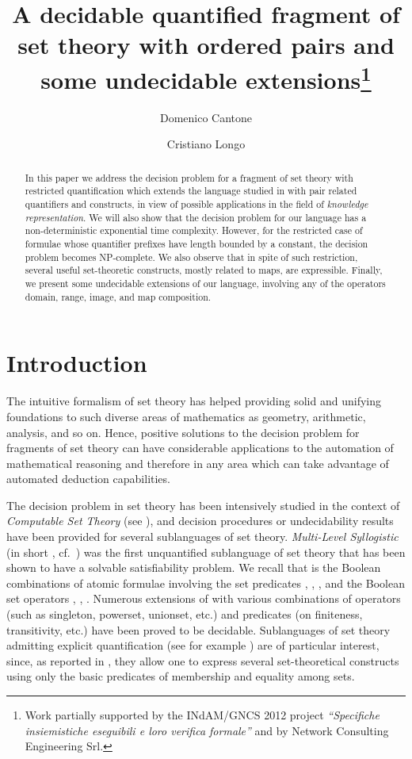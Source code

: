 \documentclass[submission,copyright,creativecommons]{eptcs}
\title{A decidable quantified fragment of set theory with ordered
pairs and some undecidable extensions\thanks{Work partially supported
by the INdAM/GNCS 2012 project
\emph{``Specifiche insiemistiche ese\-guibili e loro verifica 
formale''} and by Network Consulting Engineering Srl.}}
\author{Domenico Cantone
\institute{Department of Mathematics and Computer Science\\
University of Catania, Italy}
\email{cantone@dmi.unict.it}
\and
Cristiano Longo
\institute{Network Consulting Engineering\\
Valverde, Catania, Italy} \email{cristiano.longo@nce.eu} }
\begin{document}
\maketitle

\begin{abstract}
In this paper we address the decision problem for a fragment of set
theory with restricted quantification which extends the language
studied in \cite{BreFerOmoSch1981} with pair related quantifiers and
constructs, in view of possible applications in the field of
\emph{knowledge representation}.
We will also show that the decision problem for our language has a
non-deterministic exponential time complexity.  However, for the
restricted case of formulae whose quantifier prefixes have length
bounded by a constant, the decision problem becomes
\textsc{NP}-complete.  We also observe that in spite of such
restriction, several useful set-theoretic constructs, mostly related
to maps, are expressible.  Finally, we present some undecidable
extensions of our language, involving any of the operators domain,
range, image, and map composition.
\end{abstract}



\section{Introduction}\label{INTRO}

The intuitive formalism of set theory has helped providing solid and
unifying foundations to such diverse areas of mathematics as geometry,
arithmetic, analysis, and so on.
Hence, positive solutions to the decision problem for fragments of
set theory can have considerable applications to the automation of
mathematical reasoning and therefore in any area which can take
advantage of automated deduction capabilities.

The decision problem in set theory has been intensively studied
in the context of \emph{Computable Set Theory} (see
\cite{CanFerOmo89a,CanOmoPol01,SchCanOmo11}), and decision
procedures or undecidability results have been provided for several
sublanguages of set theory.
\emph{Multi-Level Syllogistic} (in short \mls, cf.\
\cite{FerOmoSch1980}) was the first unquantified sublanguage of set
theory that has been shown to have a solvable satisfiability problem.
We recall that \mls is the Boolean combinations of atomic formulae
involving the set predicates , , , and the Boolean
set operators , , .  Numerous
extensions of \mls with various combinations of operators (such as
singleton, powerset, unionset, etc.)  and predicates (on finiteness,
transitivity, etc.)  have been proved to be decidable.  Sublanguages
of set theory admitting explicit quantification (see for example
\cite{BreFerOmoSch1981, OmoPol2010, OmoPol2012, CanLonNic2011}) are of
particular interest, since, as reported in \cite{BreFerOmoSch1981},
they allow one to express several set-theoretical constructs using
only the basic predicates of membership and equality among sets.
\end{document}
